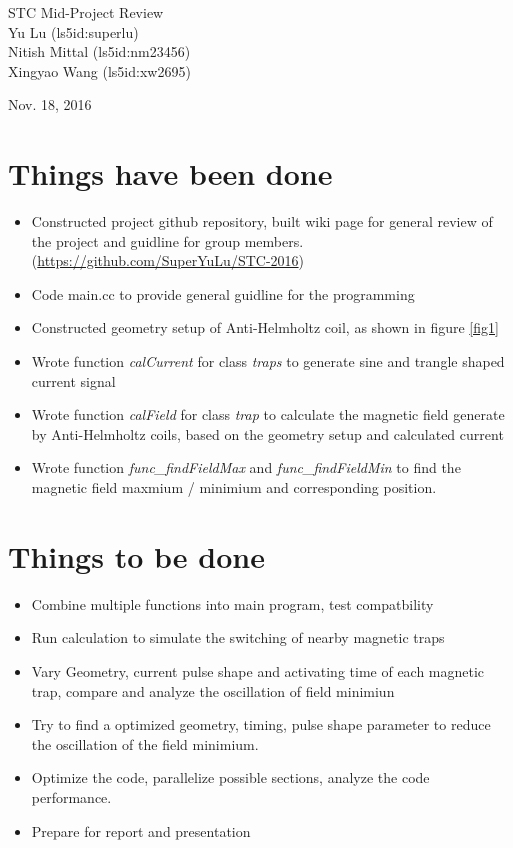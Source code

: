 \documentclass[11pt, xcolor=dvipsnames]{article}
\begin{document}
\begingroup  
\centering
\LARGE STC Mid-Project Review\\[0.5em]
\large Yu Lu (ls5id:superlu) \\  Nitish Mittal (ls5id:nm23456)\\Xingyao Wang (ls5id:xw2695)\\[0.5em]\par 
\large Nov. 18, 2016\\
\endgroup
  

\section*{Things have been done}
\begin{itemize}
\item Constructed project github repository, built wiki page for general review of the project and guidline for group members. (\url{https://github.com/SuperYuLu/STC-2016})
\item Code main.cc to provide general guidline for the programming
\item Constructed geometry setup of Anti-Helmholtz coil, as shown in figure \ref{fig1}
\item Wrote function \textit{calCurrent} for class \textit{traps} to generate sine and trangle shaped current signal
\item Wrote function \textit{calField} for class \textit{trap} to calculate the magnetic field generate by Anti-Helmholtz coils, based on the geometry setup and calculated current
\item Wrote function \textit{func\_findFieldMax} and \textit{func\_findFieldMin} to find the magnetic field maxmium / minimium and corresponding position.\\
\end{itemize}

\section*{Things to be done}
\begin{itemize}
\item Combine multiple functions into main program, test compatbility
\item Run calculation to simulate the switching of nearby magnetic traps
\item Vary Geometry, current pulse shape  and activating time of each magnetic trap, compare and analyze the oscillation of field minimiun
\item Try to find a optimized geometry, timing, pulse shape parameter to reduce the oscillation of the field minimium.
\item Optimize the code, parallelize possible sections, analyze the code performance.
\item Prepare for report and presentation
\end{itemize}
\end{document}
